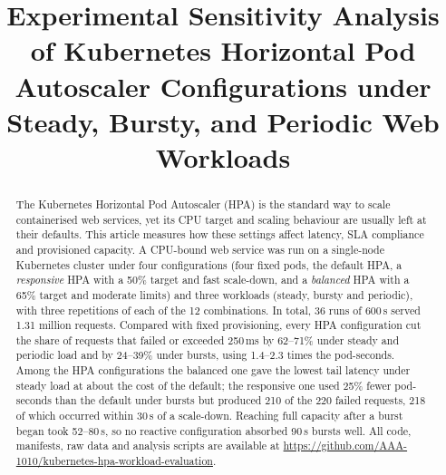 \documentclass[conference,a4paper]{IEEEtran}
\begin{document}
\title{Experimental Sensitivity Analysis of Kubernetes Horizontal Pod Autoscaler Configurations under Steady, Bursty, and Periodic Web Workloads}

\author{
\and
{}
}

\maketitle

\begin{abstract}
The Kubernetes Horizontal Pod Autoscaler (HPA) is the standard way to
scale containerised web services, yet its CPU target and scaling behaviour are
usually left at their defaults. This article measures how these settings affect
latency, SLA compliance and provisioned capacity. A CPU-bound web service was
run on a single-node Kubernetes cluster under four configurations (four fixed
pods, the default HPA, a \emph{responsive} HPA with a 50\% target and fast
scale-down, and a \emph{balanced} HPA with a 65\% target and moderate limits)
and three workloads (steady, bursty and periodic), with three repetitions of
each of the 12 combinations. In total, 36 runs of 600\,s served 1.31 million requests. Compared
with fixed provisioning, every HPA configuration cut the share of requests that
failed or exceeded 250\,ms by 62--71\% under steady and periodic load and by
24--39\% under bursts, using 1.4--2.3 times the pod-seconds. Among the HPA
configurations the balanced one gave the lowest tail latency under steady load
at about the cost of the default; the responsive one used 25\% fewer
pod-seconds than the default under bursts but produced 210 of the 220 failed
requests, 218 of which occurred within 30\,s of a scale-down. Reaching full capacity after a burst began took 52--80\,s, so
no reactive configuration absorbed 90\,s bursts well. All code, manifests, raw data and
analysis scripts are available at
\url{https://github.com/AAA-1010/kubernetes-hpa-workload-evaluation}.
\end{abstract}
\end{document}
